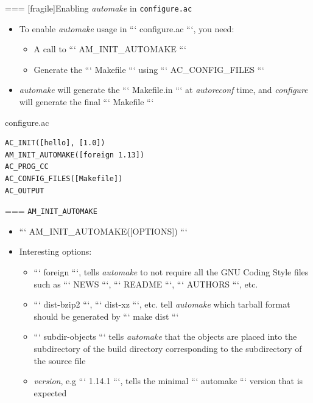 

=== [fragile]{Enabling {\em automake} in {\tt configure.ac}}
  \begin{itemize}
  \item To enable {\em automake} usage in ``` configure.ac ```, you
    need:
    \begin{itemize}
    \item A call to ``` AM_INIT_AUTOMAKE ```
    \item Generate the ``` Makefile ``` using ``` AC_CONFIG_FILES ```
    \end{itemize}
  \item {\em automake} will generate the ``` Makefile.in ``` at {\em
      autoreconf} time, and {\em configure} will generate the final
    ``` Makefile ```
  \end{itemize}

  \begin{block}{configure.ac}
\begin{verbatim}
AC_INIT([hello], [1.0])
AM_INIT_AUTOMAKE([foreign 1.13])
AC_PROG_CC
AC_CONFIG_FILES([Makefile])
AC_OUTPUT
\end{verbatim}
  \end{block}



=== {{\tt AM\_INIT\_AUTOMAKE}}

  \begin{itemize}
  \item ``` AM_INIT_AUTOMAKE([OPTIONS]) ```
  \item Interesting options:
    \begin{itemize}
    \item ``` foreign ```, tells {\em automake} to not require all the
      GNU Coding Style files such as ``` NEWS ```, ``` README ```,
      ``` AUTHORS ```, etc.
    \item ``` dist-bzip2 ```, ``` dist-xz ```, etc. tell {\em automake}
      which tarball format should be generated by ``` make dist ```
    \item ``` subdir-objects ``` tells {\em automake} that the objects
      are placed into the subdirectory of the build directory
      corresponding to the subdirectory of the source file
    \item {\em version}, e.g ``` 1.14.1 ```, tells the minimal
      ``` automake ``` version that is expected
    \end{itemize}
  \end{itemize}


